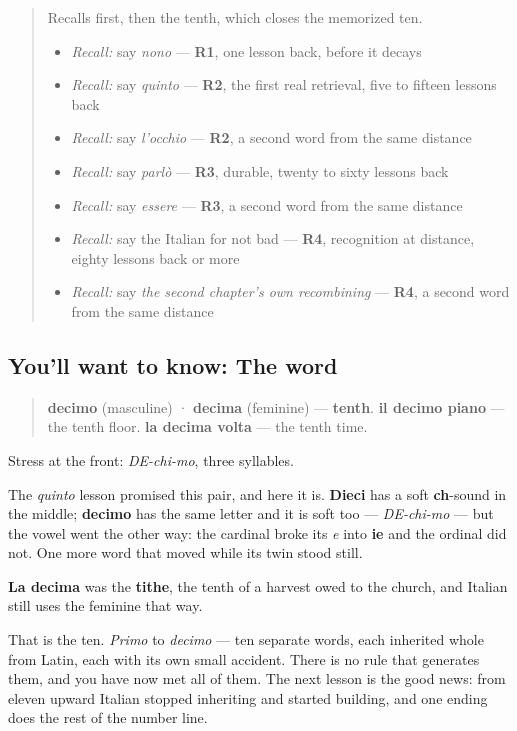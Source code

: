 \label{lesson:IT-C27-decimo}



\begin{quote}
Recalls first, then the tenth, which closes the memorized ten.

\begin{itemize}
\raggedright
  \item \emph{Recall:} say \emph{nono} — \textbf{R1}, one lesson back, before it decays
  \item \emph{Recall:} say \emph{quinto} — \textbf{R2}, the first real retrieval, five to fifteen lessons back
  \item \emph{Recall:} say \emph{l'occhio} — \textbf{R2}, a second word from the same distance
  \item \emph{Recall:} say \emph{parlò} — \textbf{R3}, durable, twenty to sixty lessons back
  \item \emph{Recall:} say \emph{essere} — \textbf{R3}, a second word from the same distance
  \item \emph{Recall:} say the Italian for not bad — \textbf{R4}, recognition at distance, eighty lessons back or more
  \item \emph{Recall:} say \emph{the second chapter's own recombining} — \textbf{R4}, a second word from the same distance
\end{itemize}
\end{quote}

\subsection*{You'll want to know: The word}
\begin{quote}
\textbf{decimo} (masculine) · \textbf{decima} (feminine) — \textbf{tenth}. \textbf{il decimo piano} — the tenth floor. \textbf{la decima volta} — the tenth time.
\end{quote}

Stress at the front: \emph{DE-chi-mo}, three syllables.

\begin{grammarlens}[title={What you've built: the split, and the end of the list}]
The \emph{quinto} lesson promised this pair, and here it is. \textbf{Dieci} has a soft \textbf{ch}-sound in the middle; \textbf{decimo} has the same letter and it is soft too — \emph{DE-chi-mo} — but the vowel went the other way: the cardinal broke its \emph{e} into \textbf{ie} and the ordinal did not. One more word that moved while its twin stood still.

\textbf{La decima} was the \textbf{tithe}, the tenth of a harvest owed to the church, and Italian still uses the feminine that way.

That is the ten. \emph{Primo} to \emph{decimo} — ten separate words, each inherited whole from Latin, each with its own small accident. There is no rule that generates them, and you have now met all of them. The next lesson is the good news: from eleven upward Italian stopped inheriting and started building, and one ending does the rest of the number line.
\end{grammarlens}

